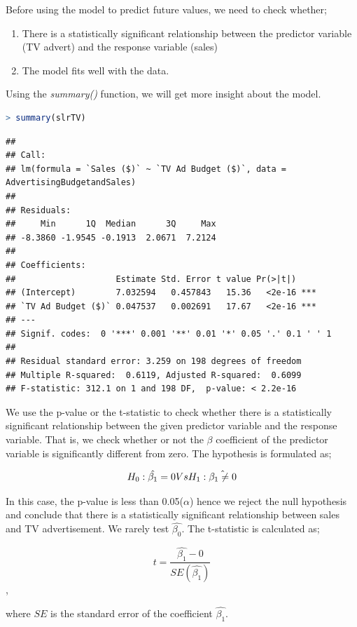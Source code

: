 \documentclass[
]{article}
\begin{document}
Before using the model to predict future values, we need to check
whether;

\begin{enumerate}
\def\labelenumi{\arabic{enumi}.}
\item
  There is a statistically significant relationship between the
  predictor variable (TV advert) and the response variable (sales)
\item
  The model fits well with the data.
\end{enumerate}

Using the \emph{summary()} function, we will get more insight about the
model.

\begin{lstlisting}[language=R]
> summary(slrTV)
\end{lstlisting}

\begin{lstlisting}
## 
## Call:
## lm(formula = `Sales ($)` ~ `TV Ad Budget ($)`, data = AdvertisingBudgetandSales)
## 
## Residuals:
##     Min      1Q  Median      3Q     Max 
## -8.3860 -1.9545 -0.1913  2.0671  7.2124 
## 
## Coefficients:
##                    Estimate Std. Error t value Pr(>|t|)    
## (Intercept)        7.032594   0.457843   15.36   <2e-16 ***
## `TV Ad Budget ($)` 0.047537   0.002691   17.67   <2e-16 ***
## ---
## Signif. codes:  0 '***' 0.001 '**' 0.01 '*' 0.05 '.' 0.1 ' ' 1
## 
## Residual standard error: 3.259 on 198 degrees of freedom
## Multiple R-squared:  0.6119, Adjusted R-squared:  0.6099 
## F-statistic: 312.1 on 1 and 198 DF,  p-value: < 2.2e-16
\end{lstlisting}

We use the p-value or the t-statistic to check whether there is a
statistically significant relationship between the given predictor
variable and the response variable. That is, we check whether or not the
\(\beta\) coefficient of the predictor variable is significantly
different from zero. The hypothesis is formulated as;

\[H_0:\hat{\beta_1}=0\space\space Vs\space\space \space H_1:\hat{\beta_1\neq 0}\]

In this case, the p-value is less than 0.05(\(\alpha\)) hence we reject
the null hypothesis and conclude that there is a statistically
significant relationship between sales and TV advertisement. We rarely
test \(\hat{\beta_0}\). The t-statistic is calculated as;

\[t=\frac{\hat{\beta_1}-0}{SE(\hat{\beta_1})}\],

where \(SE\) is the standard error of the coefficient \(\hat{\beta_1}\).
\end{document}
